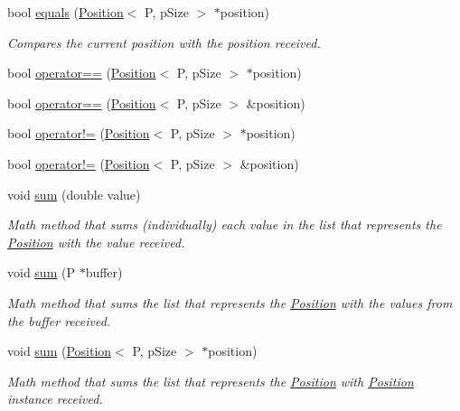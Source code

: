 \begin{DoxyCompactItemize}
bool \hyperlink{structPosition_ae49c33a4d51e79c37e9b8b33125f4857}{equals} (\hyperlink{structPosition}{Position}$<$ P, p\+Size $>$ $\ast$position)
\begin{DoxyCompactList}\small\item\em Compares the current position with the position received. \end{DoxyCompactList}\item 
bool \hyperlink{structPosition_a3d032e44c50a27d25753d11218a9c2e2}{operator==} (\hyperlink{structPosition}{Position}$<$ P, p\+Size $>$ $\ast$position)
\item 
bool \hyperlink{structPosition_a9f64fcb311f390d34d0eb4082bac294b}{operator==} (\hyperlink{structPosition}{Position}$<$ P, p\+Size $>$ \&position)
\item 
bool \hyperlink{structPosition_a90aa25928069f18dd99d3110bf1904b4}{operator!=} (\hyperlink{structPosition}{Position}$<$ P, p\+Size $>$ $\ast$position)
\item 
bool \hyperlink{structPosition_ae40fb34c593cf7b20a06291c6f5b5811}{operator!=} (\hyperlink{structPosition}{Position}$<$ P, p\+Size $>$ \&position)
\item 
void \hyperlink{structPosition_a11256d014f2958d21a1198676208df33}{sum} (double value)
\begin{DoxyCompactList}\small\item\em Math method that sums (individually) each value in the list that represents the \hyperlink{structPosition}{Position} with the value received. \end{DoxyCompactList}\item 
void \hyperlink{structPosition_ad93f2806fcb56ca3be1f8b0eda1f6b37}{sum} (P $\ast$buffer)
\begin{DoxyCompactList}\small\item\em Math method that sums the list that represents the \hyperlink{structPosition}{Position} with the values from the buffer received. \end{DoxyCompactList}\item 
void \hyperlink{structPosition_a530f7539f8e0673e484f029c53b412b8}{sum} (\hyperlink{structPosition}{Position}$<$ P, p\+Size $>$ $\ast$position)
\begin{DoxyCompactList}\small\item\em Math method that sums the list that represents the \hyperlink{structPosition}{Position} with \hyperlink{structPosition}{Position} instance received. \end{DoxyCompactList}\item 

\end{DoxyCompactItemize}
